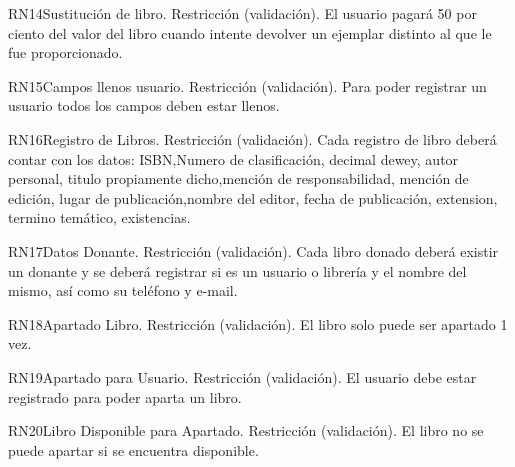 \begin{BussinesRule}{RN14}{Sustitución de libro.} 
	\BRitem[Tipo:] Restricción (validación).
	\BRitem[Descripción:]El usuario pagará 50 por ciento del valor del libro cuando intente devolver un ejemplar distinto al que le fue proporcionado.
\end{BussinesRule}

\begin{BussinesRule}{RN15}{Campos llenos usuario.} 
	\BRitem[Tipo:] Restricción (validación).
	\BRitem[Descripción:]Para poder registrar un usuario todos los campos deben estar llenos.
\end{BussinesRule}

\begin{BussinesRule}{RN16}{Registro de Libros.} 
	\BRitem[Tipo:] Restricción (validación).
	\BRitem[Descripción:]Cada registro de libro deberá contar con los datos: ISBN,Numero de clasificación, decimal dewey, autor personal, titulo propiamente dicho,mención de responsabilidad, mención de edición, lugar de publicación,nombre del editor, fecha de publicación, extension, termino temático, existencias.
\end{BussinesRule}

\begin{BussinesRule}{RN17}{Datos Donante.} 
	\BRitem[Tipo:] Restricción (validación).
	\BRitem[Descripción:]Cada libro donado deberá existir un donante y se deberá registrar si es un usuario o librería y el nombre del mismo, así como su teléfono y e-mail.
\end{BussinesRule}

\begin{BussinesRule}{RN18}{Apartado Libro.} 
	\BRitem[Tipo:] Restricción (validación).
	\BRitem[Descripción:]El libro solo puede ser apartado 1 vez.
\end{BussinesRule}

\begin{BussinesRule}{RN19}{Apartado para Usuario.} 
	\BRitem[Tipo:] Restricción (validación).
	\BRitem[Descripción:]El usuario debe estar registrado para poder aparta un libro.
\end{BussinesRule}

\begin{BussinesRule}{RN20}{Libro Disponible para Apartado.} 
	\BRitem[Tipo:] Restricción (validación).
	\BRitem[Descripción:]El libro no se puede apartar si se encuentra disponible.
\end{BussinesRule}

